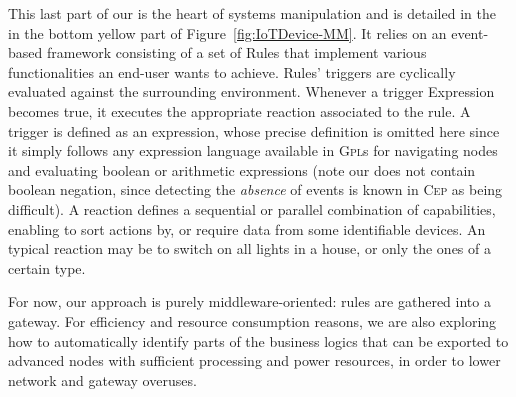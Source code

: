 This last part of our \DSL is the heart of \IOT systems manipulation and is detailed in the in the bottom yellow part of Figure~\ref{fig:IoTDevice-MM}. It relies on an event-based framework consisting of a set of \textsf{Rule}s that implement various functionalities an end-user wants to achieve. Rules' \textsf{trigger}s are cyclically evaluated against the surrounding environment. Whenever a \textsf{trigger} \textsf{Expression} becomes true, it executes the appropriate \textsf{reaction} associated to the rule. A \textsf{trigger} is defined as an expression, whose precise definition is omitted here since it simply follows any expression language available in \textsc{Gpl}s for navigating nodes and evaluating boolean or arithmetic expressions (note our \DSL does not contain boolean negation, since detecting the \emph{absence} of events is known in \textsc{Cep} as being difficult). A \textsf{reaction} defines a sequential or parallel combination of capabilities, enabling to sort actions by, or require data from some identifiable devices. An typical \textsf{reaction} may be to switch on all lights in a house, or only the ones of a certain type.

For now, our approach is purely middleware-oriented: rules are gathered into a gateway. For efficiency and resource consumption reasons, we are also exploring how to automatically identify parts of the business logics that can be exported to advanced nodes with sufficient processing and power resources, in order to lower network and gateway overuses.

